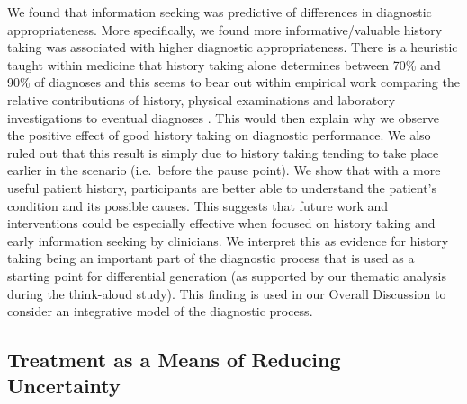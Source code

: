 \documentclass[a4paper, nobind]{templates/ociamthesis}
\begin{document}
We found that information seeking was predictive of differences in diagnostic appropriateness. More specifically, we found more informative/valuable history taking was associated with higher diagnostic appropriateness. There is a heuristic taught within medicine that history taking alone determines between 70\% and 90\% of diagnoses \autocite{keifenheim_teaching_2015} and this seems to bear out within empirical work comparing the relative contributions of history, physical examinations and laboratory investigations to eventual diagnoses \autocite{hampton_relative_1975,peterson_contributions_1992,tsukamoto_contribution_2012}. This would then explain why we observe the positive effect of good history taking on diagnostic performance. We also ruled out that this result is simply due to history taking tending to take place earlier in the scenario (i.e.~before the pause point). We show that with a more useful patient history, participants are better able to understand the patient's condition and its possible causes. This suggests that future work and interventions could be especially effective when focused on history taking and early information seeking by clinicians. We interpret this as evidence for history taking being an important part of the diagnostic process \autocite{tio_effect_2022} that is used as a starting point for differential generation (as supported by our thematic analysis during the think-aloud study). This finding is used in our Overall Discussion to consider an integrative model of the diagnostic process.

\subsection{Treatment as a Means of Reducing Uncertainty}\label{treatment-as-a-means-of-reducing-uncertainty}
\end{document}
